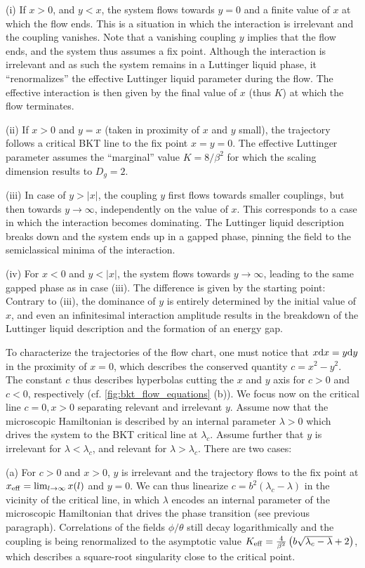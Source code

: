 (i) If $x>0$, and $y<x$, the system flows towards $y=0$ and a finite value of $x$ at which the flow ends.
This is a situation in which the interaction is irrelevant and the coupling vanishes.
Note that a vanishing coupling $y$ implies that the flow ends, and the system thus assumes a fix point.
Although the interaction is irrelevant and as such the system remains in a Luttinger liquid phase, it ``renormalizes'' the effective Luttinger liquid parameter during the flow.
The effective interaction is then given by the final value of $x$ (thus $K$) at which the flow terminates.

(ii) If $x>0$ and $y=x$ (taken in proximity of $x$ and $y$ small), the trajectory follows a critical BKT line to the fix point $x=y=0$.
The effective Luttinger parameter assumes the ``marginal'' value $K=8/\beta^2$ for which the scaling dimension results to $D_g=2$.

(iii) In case of $y>|x|$, the coupling $y$ first flows towards smaller couplings, but then towards $y\rightarrow\infty$, independently on the value of $x$.
This corresponds to a case in which the interaction becomes dominating.
The Luttinger liquid description breaks down and the system ends up in a gapped phase, pinning the field to the semiclassical minima of the interaction.

(iv) For $x<0$ and $y<|x|$, the system flows towards $y\rightarrow\infty$, leading to the same gapped phase as in case (iii).
The difference is given by the starting point: Contrary to (iii), the dominance of $y$ is entirely determined by the initial value of $x$, and even an infinitesimal interaction amplitude results in the breakdown of the Luttinger liquid description and the formation of an energy gap.

To characterize the trajectories of the flow chart, one must notice that $x\mathrm d x = y\mathrm d y$ in the proximity of $x=0$, which describes the conserved quantity $c = x^2-y^2$.
The constant $c$ thus describes hyperbolas cutting the $x$ and $y$ axis for $c>0$ and $c<0$, respectively (cf. \cref{fig:bkt_flow_equations} (b)).
We focus now on the critical line $c=0, x>0$ separating relevant and irrelevant $y$.
Assume now that the microscopic Hamiltonian is described by an internal parameter $\lambda>0$ which drives the system to the BKT critical line at $\lambda_c$.
Assume further that $y$ is irrelevant for $\lambda<\lambda_c$, and relevant for $\lambda>\lambda_c$.
There are two cases:

(a) For $c>0$ and $x>0$, $y$ is irrelevant and the trajectory flows to the fix point at $x_{\rm eff} = \lim_{l\rightarrow\infty} x(l)$ and $y=0$.
We can thus linearize $c=b^2(\lambda_c-\lambda)$ in the vicinity of the critical line, in which $\lambda$ encodes an internal parameter of the microscopic Hamiltonian that drives the phase transition (see previous paragraph).
Correlations of the fields $\phi/\theta$ still decay logarithmically and the coupling is being renormalized to the asymptotic value $K_{\rm eff} = \frac4{\beta^2}\left( b\sqrt{\lambda_c-\lambda}+2 \right)$, which describes a square-root singularity close to the critical point.

